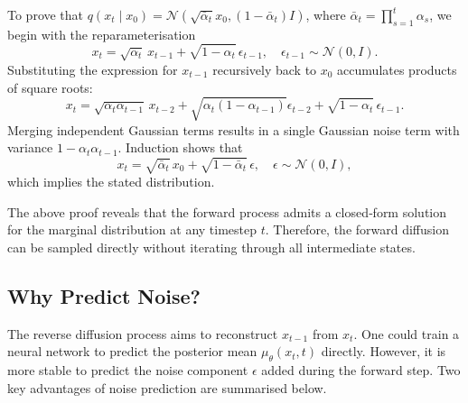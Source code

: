\begin{solutionbox}
  To prove that $q(x_t\mid x_0) = \mathcal{N}(\sqrt{\bar{\alpha}_t} x_0,
  (1 - \bar{\alpha}_t)I)$, where $\bar{\alpha}_t = \prod_{s=1}^t
  \alpha_s$, we begin with the reparameterisation
  \begin{equation}
    x_t = \sqrt{\alpha_t}\,x_{t-1} + \sqrt{1-\alpha_t}\,\epsilon_{t-1},
    \quad \epsilon_{t-1} \sim \mathcal{N}(0,I).
  \end{equation}
  Substituting the expression for $x_{t-1}$ recursively back to
  $x_0$ accumulates products of square roots:
  \begin{equation}
    x_t = \sqrt{\alpha_t\alpha_{t-1}}\,x_{t-2} + \sqrt{\alpha_t(1-\alpha_{t-1})}
    \epsilon_{t-2} + \sqrt{1-\alpha_t}\,\epsilon_{t-1}.
  \end{equation}
  Merging independent Gaussian terms results in a single Gaussian
  noise term with variance $1 - \alpha_t\alpha_{t-1}$.  Induction
  shows that
  \begin{equation}
    x_t = \sqrt{\bar{\alpha}_t}\,x_0 + \sqrt{1 - \bar{\alpha}_t}\,\epsilon,
    \quad \epsilon \sim \mathcal{N}(0,I),
  \end{equation}
  which implies the stated distribution.
\end{solutionbox}

The above proof reveals that the forward process admits a closed‑form
solution for the marginal distribution at any timestep $t$.
Therefore, the forward diffusion can be sampled directly without
iterating through all intermediate states.

\subsection{Why Predict Noise?}

The reverse diffusion process aims to reconstruct $x_{t-1}$ from
$x_t$.  One could train a neural network to predict the posterior
mean $\mu_\theta(x_t, t)$ directly.  However, it is more stable to
predict the noise component $\epsilon$ added during the forward step.
Two key advantages of noise prediction are summarised below.

